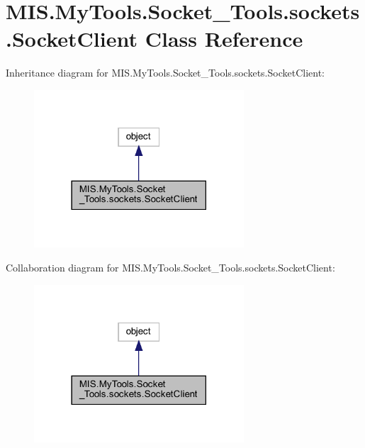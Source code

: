 \hypertarget{classMIS_1_1MyTools_1_1Socket__Tools_1_1sockets_1_1SocketClient}{}\section{M\+I\+S.\+My\+Tools.\+Socket\+\_\+\+Tools.\+sockets.\+Socket\+Client Class Reference}
\label{classMIS_1_1MyTools_1_1Socket__Tools_1_1sockets_1_1SocketClient}


Inheritance diagram for M\+I\+S.\+My\+Tools.\+Socket\+\_\+\+Tools.\+sockets.\+Socket\+Client\+:\nopagebreak
\begin{figure}[H]
\begin{center}
\leavevmode
\includegraphics[width=222pt]{classMIS_1_1MyTools_1_1Socket__Tools_1_1sockets_1_1SocketClient__inherit__graph}
\end{center}
\end{figure}


Collaboration diagram for M\+I\+S.\+My\+Tools.\+Socket\+\_\+\+Tools.\+sockets.\+Socket\+Client\+:\nopagebreak
\begin{figure}[H]
\begin{center}
\leavevmode
\includegraphics[width=222pt]{classMIS_1_1MyTools_1_1Socket__Tools_1_1sockets_1_1SocketClient__coll__graph}
\end{center}
\end{figure}
